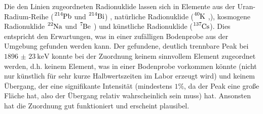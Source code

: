 Die den Linien zugeordneten Radionuklide lassen sich in Elemente aus der Uran-Radium-Reihe ($\ce{^214Pb}$ und $\ce{^214Bi}$) \cite[3]{list_bmumwelt}, natürliche Radionuklide ($\ce{^40K}$ \cite[55]{ex_techniques},\cite[13]{list_bmumwelt}), kosmogene Radionuklide $\ce{^22Na}$ und $\ce{^7Be}$ \cite{be7}) und künstliche Radionuklide ($\ce{^137Cs}$). Dies entspricht den Erwartungen, was in einer zufälligen Bodenprobe aus der Umgebung gefunden werden kann. Der gefundene, deutlich trennbare Peak bei $\SI{1896(23)}{\kilo\eV}$ konnte bei der Zuordnung keinem sinnvollem Element zugeordnet werden, d.h. keinem Element, was in einer Bodenprobe vorkommen könnte (nicht nur künstlich für sehr kurze Halbwertszeiten im Labor erzeugt wird) und keinem Übergang, der eine signifikante Intensität (mindestens $1\%$, da der Peak eine große Fläche hat, also der Übergang relativ wahrscheinlich sein muss) hat. Ansonsten hat die Zuordnung gut funktioniert und erscheint plausibel.
